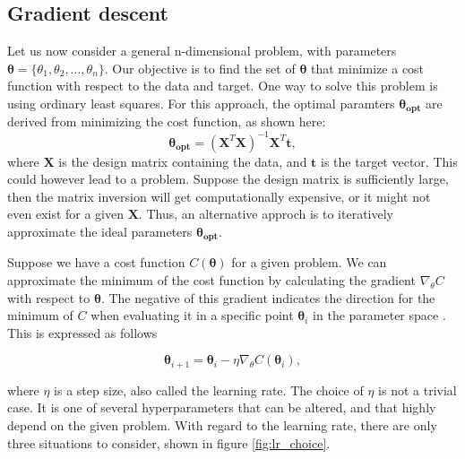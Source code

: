 \subsection*{Gradient descent}
Let us now consider a general n-dimensional problem, with parameters $\boldsymbol{\theta} = \{\theta_1, \theta_2, ..., \theta_n\}$. 
Our objective is to find the set of $\boldsymbol{\theta}$ that minimize a cost function with respect to the data and target. 
One way to solve this problem is using ordinary least squares. For this approach, 
the optimal paramters $\boldsymbol{\theta_{opt}}$ are derived from minimizing the cost function, as shown here:
\begin{equation*}
    \boldsymbol{\theta_{opt}} = (\boldsymbol{X}^T\boldsymbol{X})^{-1}\boldsymbol{X}^T\boldsymbol{t},
\end{equation*}
where $\boldsymbol{X}$ is the design matrix containing the data, and $\boldsymbol{t}$ is the target vector. This could however lead to a problem. 
Suppose the design matrix is sufficiently large, then the matrix inversion will get 
computationally expensive, or it might not even exist for a given $\boldsymbol{X}$. 
Thus, an alternative approch is to iteratively approximate the ideal parameters $\boldsymbol{\theta_{opt}}$. \par 
Suppose we have a cost function $C(\boldsymbol{\theta})$ for a given problem. We can approximate the minimum of 
the cost function by calculating the gradient $\nabla_{\theta}C$ with respect to $\boldsymbol{\theta}$. 
The negative of this gradient indicates the direction for the minimum of $C$ when evaluating 
it in a specific point $\boldsymbol{\theta}_i$ in the parameter space \cite{FYSSTK}. This is expressed as follows 

\begin{equation}\label{eq:grad}
    \boldsymbol{\theta}_{i+1} = \boldsymbol{\theta}_i - \eta\nabla_{\theta}C(\boldsymbol{\theta}_i),
\end{equation}

where $\eta$ is a step size, also called the learning rate. The choice of $\eta$ is not a trivial case. It is one of several 
hyperparameters\cite{Goodfellow-et-al-2016} that can be altered, and that highly depend on the given problem. 
With regard to the learning rate, there are only three situations to consider, shown in figure \ref{fig:lr_choice}.

